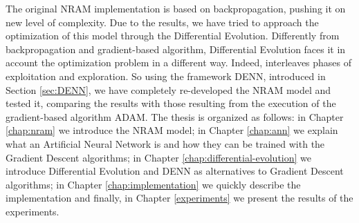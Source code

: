 The original NRAM implementation is based on backpropagation, pushing it on new level of complexity. Due to the results, we have tried to approach the optimization of this model through the Differential Evolution. Differently from backpropagation and gradient-based algorithm, Differential Evolution faces it in account the optimization problem in a different way. Indeed, interleaves phases of exploitation and exploration. So using the framework DENN, introduced in Section \ref{sec:DENN}, we have completely re-developed the NRAM model and tested it, comparing the results with those resulting from the execution of the gradient-based algorithm ADAM.\newline\newline
The thesis is organized as follows: in Chapter \ref{chap:nram} we introduce the NRAM model; in Chapter \ref{chap:ann} we explain what an Artificial Neural Network is and how they can be trained with the Gradient Descent algorithms; in Chapter \ref{chap:differential-evolution} we introduce Differential Evolution and DENN as alternatives to Gradient Descent algorithms; in Chapter \ref{chap:implementation} we quickly describe the implementation and finally, in Chapter \ref{experiments} we present the results of the experiments.